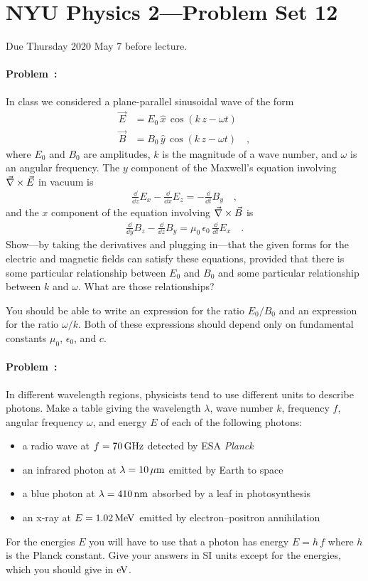 \documentclass[12pt]{article}
\begin{document}
\section*{NYU Physics 2---Problem Set 12}

Due Thursday 2020 May 7 before lecture.

\paragraph{Problem~\theproblem:}%
In class we considered a plane-parallel sinusoidal wave of the form
\begin{align}
  \vec{E} &= E_0\,\hat{x}\,\cos(k\,z - \omega t) \\
  \vec{B} &= B_0\,\hat{y}\,\cos(k\,z - \omega t) \quad ,
\end{align}
where $E_0$ and $B_0$ are amplitudes, $k$ is the magnitude of a
wave number, and $\omega$ is an angular frequency.
The $y$ component of the Maxwell's equation involving
$\vec{\nabla}\times{\vec{E}}$ in vacuum is
\begin{align}
  \frac{\dd}{\dd z}E_x - \frac{\dd}{\dd x}E_z = -\frac{\dd}{\dd t}B_y
  \quad ,
\end{align}
and the $x$ component of the equation involving $\vec{\nabla}\times{\vec{B}}$ is
\begin{align}
  \frac{\dd}{\dd y}B_z - \frac{\dd}{\dd z}B_y = \mu_0\,\epsilon_0\,\frac{\dd}{\dd t}E_x
  \quad .
\end{align}
Show---by taking the derivatives and plugging in---that the given forms
for the electric and magnetic fields can
satisfy these equations, provided that there is some particular relationship
between $E_0$ and $B_0$ and some particular relationship between $k$ and $\omega$.
What are those relationships?

You should be able to write an
expression for the ratio $E_0/B_0$ and an expression for the ratio $\omega/k$.
Both of these expressions should depend only on fundamental constants
$\mu_0$, $\epsilon_0$, and $c$.

\paragraph{Problem~\theproblem:}%
In different wavelength regions, physicists tend to use different
units to describe photons. Make a table giving the wavelength
$\lambda$, wave number $k$, frequency $f$, angular frequency $\omega$,
and energy $E$ of each of the following photons:
\begin{itemize}
\item a radio wave at $f=70\,\mathrm{GHz}$ detected by ESA \textsl{Planck}
\item an infrared photon at $\lambda=10\,\mathrm{\mu m}$ emitted by Earth to space
\item a blue photon at $\lambda=410\,\mathrm{nm}$ absorbed by a leaf in photosynthesis
\item an x-ray at $E=1.02\,\mathrm{MeV}$ emitted by electron--positron annihilation
\end{itemize}
For the energies $E$ you will have to use that a photon has energy $E=h\,f$
where $h$ is the Planck constant. Give your answers in SI units except for the
energies, which you should give in $\mathrm{eV}$.
\end{document}
